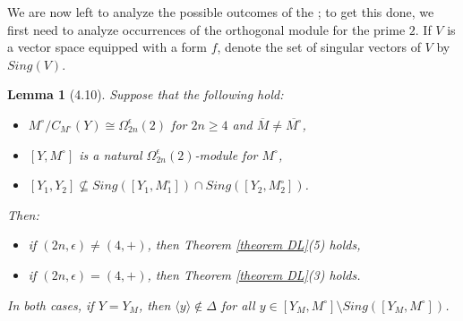 \documentclass{amsart}
\numberwithin{equation}{section}
\newtheorem{lemma}[equation]{Lemma}
\theoremstyle{definition}
\theoremstyle{subresult}
\theoremstyle{caseresult}
\newcommand{\ov}{\overline}
\newcommand{\<}{\langle}
\renewcommand{\>}{\rangle}
\begin{document}
We are now left to analyze the possible outcomes of the ; to get this done, we first need to analyze occurrences of the orthogonal module for the prime $2$. If $V$ is a vector space equipped with a form $f$, denote the set of singular vectors of $V$ by $Sing(V)$.

\begin{lemma}[4.10] \label{lemma4.10}
	Suppose that the following hold:
	\begin{itemize}
		\item[(i)] $M^\circ / C_{M^\circ}(Y) \cong \Omega_{2n}^\epsilon (2)$ for $2n \ge 4$ and $\ov{M} \ne \ov{M^\circ}$,
		\item[(ii)] $[Y,M^\circ]$ is a natural $\Omega_{2n}^\epsilon(2)$-module for $M^\circ$,
		\item[(iii)] $[Y_1,Y_2] \not \subseteq Sing([Y_1,M_1^\circ]) \cap Sing([Y_2,M_2^\circ])$.
	\end{itemize}
	Then:
	\begin{itemize}
		\item[(a)] if $(2n,\epsilon) \ne (4,+)$, then Theorem \ref{theorem DL}(5) holds,
		\item[(b)] if $(2n,\epsilon) = (4,+)$, then Theorem \ref{theorem DL}(3) holds.
	\end{itemize}
	In both cases, if $Y = Y_M$, then $\< y \> \not \in \Delta$ for all $y \in [Y_M,M^\circ] \setminus Sing([Y_M,M^\circ])$.
\end{lemma}
\end{document}
